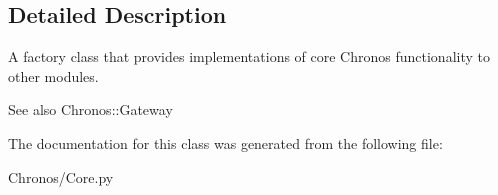 \subsection{Detailed Description}
A factory class that provides implementations of core Chronos functionality to other modules. 

\begin{DoxySeeAlso}{See also}
Chronos\+::\+Gateway 
\end{DoxySeeAlso}


The documentation for this class was generated from the following file\+:\begin{DoxyCompactItemize}
\item 
Chronos/Core.\+py\end{DoxyCompactItemize}
